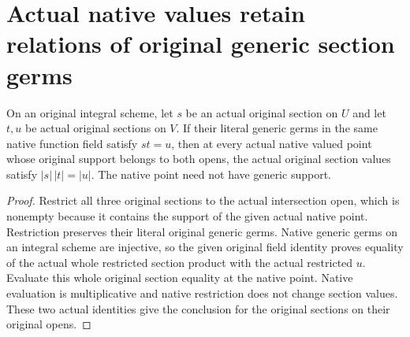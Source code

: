 \section{Actual native values retain relations of original generic section germs}
\label{sec:native-generic-section-value-relations}

\begin{lemma}
\label{lem:native-generic-section-value-relations}
\leanok
{}
On an original integral scheme, let $s$ be an actual original section
on $U$ and let $t,u$ be actual original sections on $V$. If their literal
generic germs in the same native function field satisfy $st=u$, then
at every actual native valued point whose original support belongs
to both opens, the actual original section values satisfy
$|s|\,|t|=|u|$. The native point need not have generic support.
\end{lemma}
\begin{proof}
Restrict all three original sections to the actual intersection open,
which is nonempty because it contains the support of the given actual
native point. Restriction preserves their literal original generic
germs. Native generic germs on an integral scheme are injective, so
the given original field identity proves equality of the actual whole
restricted section product with the actual restricted $u$. Evaluate
this whole original section equality at the native point. Native
evaluation is multiplicative and native restriction does not change
section values. These two actual identities give the conclusion for
the original sections on their original opens.
\end{proof}
